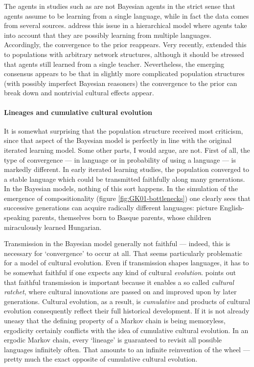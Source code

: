 \documentclass{../src/bcthesispart}
\begin{document}
The agents in studies such as \textcite{Ferdinand2009} are not Bayesian agents in the strict sense that agents assume to be learning from a single language, while in fact the data comes from several sources.
\textcite{Burkett2010} address this issue in a hierarchical model where agents take into account that they are possibly learning from multiple languages.
Accordingly, the convergence to the prior reappears.
Very recently, \textcite{Whalen2017} extended this to populations with arbitrary network structures, although it should be stressed that agents still learned from a single teacher.
Nevertheless, the emerging consensus appears to be that in slightly more complicated population structures (with possibly imperfect Bayesian reasoners) the convergence to the prior can break down and nontrivial cultural effects appear.






\paragraph{Lineages and cumulative cultural evolution}

It is somewhat surprising that the population structure received most criticism, since that aspect of the Bayesian model is perfectly in line with the original iterated learning model.
Some other parts, I would argue, are not.
First of all, the type of convergence — in language or in probability of using a language — is markedly different.
In early iterated learning studies, the population converged to a stable language which could be transmitted faithfully along many generations.
In the Bayesian models, nothing of this sort happens.
In the simulation of the emergence of compositionality (figure \ref{fig:GK01-bottlenecks}) one clearly sees that successive generations can acquire radically different languages: picture English-speaking parents, themselves born to Basque parents, whose children miraculously learned Hungarian.




Transmission in the Bayesian model generally not faithful — indeed, this is  necessary for ‘convergence’ to occur at all.
That seems particularly problematic for a model of cultural evolution.
Even if transmission shapes languages, it has to be somewhat faithful if one expects any kind of cultural \emph{evolution}.
\textcite{Tomasello1999} points out that faithful transmission is important because it enables a so called \emph{cultural ratchet}, where cultural innovations are passed on and improved upon by later generations.
Cultural evolution, as a result, is \emph{cumulative} and products of cultural evolution consequently reflect their full historical development.
If it is not already uneasy that the defining property of a Markov chain is being memoryless, ergodicity certainly conflicts with the idea of cumulative cultural evolution.
In an ergodic Markov chain, every ‘lineage’ is guaranteed to revisit all possible languages infinitely often.
That amounts to an infinite reinvention of the wheel — pretty much the exact opposite of cumulative cultural evolution.
\end{document}
